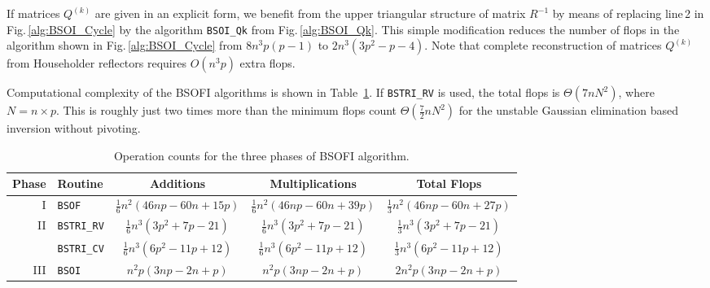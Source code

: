 \documentclass{llncs}
\begin{document}
If matrices $Q^{(k)}$ are given in an explicit form,
we benefit from the upper triangular structure of matrix $R^{-1}$
by means of replacing line\,2 %
in Fig.\,\ref{alg:BSOI_Cycle} 
by the algorithm {\tt BSOI\_Qk} from Fig.\,\ref{alg:BSOI_Qk}.
This simple modification reduces the number of flops 
in the algorithm shown in Fig.\,\ref{alg:BSOI_Cycle}
from $8n^3 p (p - 1)$ to $2 n^3 (3 p^2 - p - 4)$.
Note that complete reconstruction of matrices $Q^{(k)}$ from Householder reflectors
requires $O(n^3 p)$ extra flops.

{Computational complexity}
of the BSOFI algorithms is shown in Table~\ref{tab:developed_routines_complexity}.
If {\tt BSTRI\_RV} is used, 
the total flops is $\Theta(7 n N^2)$, where $N=n{\times}p$.
This is roughly just two times more than the 
minimum flops count $\Theta(\frac{7}{2} n  N^2)$
for the unstable Gaussian elimination based inversion 
without pivoting.

\begin{table}[t]%
  \caption[]{Operation counts for the three phases of 
    BSOFI algorithm.\footnotemark} 
  \label{tab:developed_routines_complexity}
  \begin{tabular}{r|l|c|c|c}
    \toprule
    Phase & Routine & Additions & Multiplications & Total Flops  \\
    \hline\hline
    I&{\tt BSOF} & 
    $\frac{1}{6} n^{2} \left(46 n p - 60 n + 15 p\right)$
    & $\frac{1}{6} n^{2} \left(46 n p - 60 n + 39 p\right)$
    & $\frac{1}{3} n^{2} \left(46 n p - 60 n + 27 p\right)$\\
    \hline
    II&{\tt BSTRI\_RV} & 
    $\frac{1}{6} n^3 \left(3 p^{2} + 7 p - 21\right)$
    & $\frac{1}{6} n^3 \left(3 p^{2} + 7 p - 21\right)$
    & $\frac{1}{3} n^3 \left(3 p^{2} + 7 p - 21\right)$\\
    \cline{2-5}
    &{\tt BSTRI\_CV} & 
    $\frac{1}{6} n^3 \left(6 p^{2} - 11 p + 12\right)$
    & $\frac{1}{6} n^3 \left(6 p^{2} - 11 p + 12\right)$
    & $\frac{1}{3} n^3 \left(6 p^{2} - 11 p + 12\right)$\\
    \hline
    III&{\tt BSOI} & 
    $n^{2} p \left(3 n p - 2 n + p\right)$
    & $n^2 p \left(3 n p - 2 n + p\right)$
    & $2 n^2 p \left(3 n p - 2 n + p\right)$\\
    \bottomrule  
  \end{tabular}
\end{table}
\end{document}
